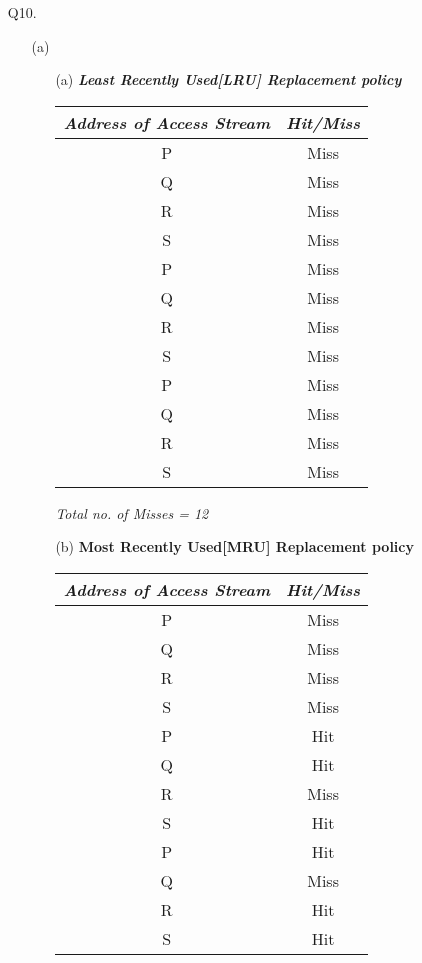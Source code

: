 \documentclass[letterpaper]{article}
\begin{document}
\begin{large}
\begin{flushleft}
\begin{enumerate}
\item[Q10.]
\begin{enumerate}
\item[(a)]
\begin{enumerate}
\item[(a)]
\textit{\textbf{Least Recently Used[LRU] Replacement policy}}
\begin{table}[h]
\centering
\begin{tabular}{|c|c|}
\hline
\textit{\textbf{Address of Access Stream}} & \textit{\textbf{Hit/Miss}}\\
\hline
P & Miss\\
\hline
Q & Miss\\
\hline
R & Miss\\
\hline
S & Miss\\
\hline
P & Miss\\
\hline
Q & Miss\\
\hline
R & Miss\\
\hline
S & Miss\\
\hline
P & Miss\\
\hline
Q & Miss\\
\hline
R & Miss\\
\hline
S & Miss\\
\hline
\end{tabular}
\end{table}
\begin{center}
\textit{Total no. of Misses = 12\\[0.2in] }
\end{center}
\clearpage
\item[(b)]
\textbf{Most Recently Used[MRU] Replacement policy}
\begin{table}[h]
\centering
\begin{tabular}{|c|c|}
\hline
\textit{\textbf{Address of Access Stream} }& \textit{\textbf{Hit/Miss}}\\
\hline
P & Miss\\
\hline
Q & Miss\\
\hline
R & Miss\\
\hline
S & Miss\\
\hline
P & Hit\\
\hline
Q & Hit\\
\hline
R & Miss\\
\hline
S & Hit\\
\hline
P & Hit\\
\hline
Q & Miss\\
\hline
R & Hit\\
\hline
S & Hit\\

\end{tabular}
\end{table}
\end{enumerate}
\end{enumerate}
\end{enumerate}
\end{flushleft}
\end{large}
\end{document}
